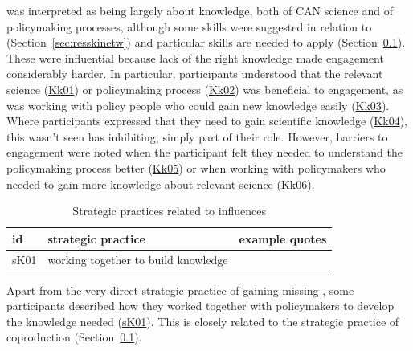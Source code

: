 \skiskil{} was interpreted as being largely about knowledge, both of CAN science and of policymaking processes, although some skills were suggested in relation to \skinetw{} (Section~\ref{sec:resskinetw}) and particular skills are needed to apply \skitech{} (Section~\ref{sec:resskitech}). These were influential because lack of the right knowledge made engagement considerably harder. In particular, participants understood that the relevant science (\hyperref[tab:resskiskil]{Kk01}) or policymaking process (\hyperref[tab:resskiskil]{Kk02}) was beneficial to engagement, as was working with policy people who could gain new knowledge easily (\hyperref[tab:resskiskil]{Kk03}). Where participants expressed that they need to gain scientific knowledge (\hyperref[tab:resskiskil]{Kk04}), this wasn't seen has inhibiting, simply part of their role. However, barriers to engagement were noted when the participant felt they needed to understand the policymaking process better (\hyperref[tab:resskiskil]{Kk05}) or when working with policymakers who needed to gain more knowledge about relevant science (\hyperref[tab:resskiskil]{Kk06}). 

\begin{table}[!ht]
\footnotesize
\caption{Strategic practices related to \skiskil{} influences}\label{tab:resskiskilstrat}
\begin{tabular}{L{.06\linewidth}L{.3\linewidth}L{.64\linewidth}} \hline
\textbf{id} & \textbf{strategic practice} & \textbf{example quotes} \\ \hline \hline
sK01 & working together to build knowledge &  \\
\hline
 \end{tabular}
\end{table}

Apart from the very direct strategic practice of gaining missing \skiskil, some participants described how they worked together with policymakers to develop the knowledge needed (\hyperref[tab:resskiskilstrat]{sK01}). This is closely related to the strategic practice of coproduction (Section~\ref{sec:resskitech}).

\subsection{\tittech}\label{sec:resskitech}

